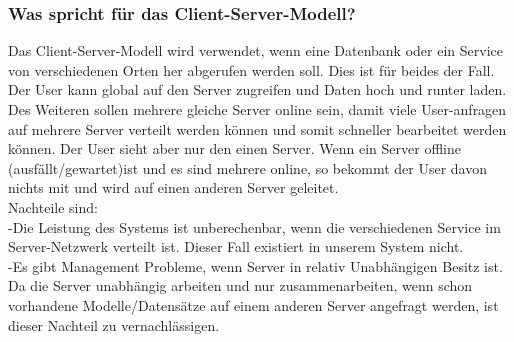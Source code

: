 \subsubsection{Was spricht für das Client-Server-Modell?}
Das Client-Server-Modell wird verwendet, wenn eine Datenbank oder ein Service von verschiedenen Orten her abgerufen werden soll. Dies ist für beides der Fall. Der User kann global auf den Server zugreifen und Daten hoch und runter laden.\\
Des Weiteren sollen mehrere gleiche Server online sein, damit viele User-anfragen auf mehrere Server verteilt werden können und somit schneller bearbeitet werden können. Der User sieht aber nur den einen Server. Wenn ein Server offline (ausfällt/gewartet)ist und es sind mehrere online, so bekommt der User davon nichts mit und wird auf einen anderen Server geleitet.\\
Nachteile sind:\\
-Die Leistung des Systems ist unberechenbar, wenn die verschiedenen Service im Server-Netzwerk verteilt ist. Dieser Fall existiert in unserem System nicht.\\
-Es gibt Management Probleme, wenn Server in relativ Unabhängigen Besitz ist. Da die Server unabhängig arbeiten und nur zusammenarbeiten, wenn schon vorhandene Modelle/Datensätze auf einem anderen Server angefragt werden, ist dieser Nachteil zu vernachlässigen.





%